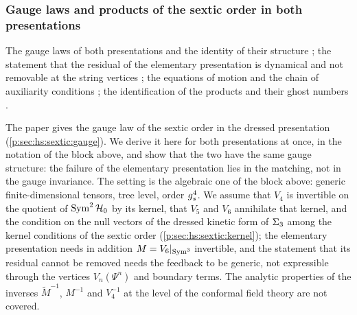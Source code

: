 \subsubsection{Gauge laws and products of the sextic order in both presentations}
\label{sec:order:sextic:both-gauge}

The gauge laws of both presentations and the identity of their structure ; the statement that the residual of the elementary presentation is dynamical and not removable at the string vertices ; the equations of motion and the chain of auxiliarity conditions ; the identification of the products and their ghost numbers .

The paper gives the gauge law of the sextic order in the dressed presentation (\cref{p:sec:hs:sextic:gauge}).
We derive it here for both presentations at once, in the notation of the block above, and show that the two have the same gauge structure: the failure of the elementary presentation lies in the matching, not in the gauge invariance.
The setting is the algebraic one of the block above: generic finite-dimensional tensors, tree level, order $g_s^4$.
We assume that $V_4$ is invertible on the quotient of $\operatorname{Sym}^2 \mathcal{H}_0$ by its kernel, that $V_5$ and $V_6$ annihilate that kernel, and the condition on the null vectors of the dressed kinetic form of $\Sigma_3$ among the kernel conditions of the sextic order (\cref{p:sec:hs:sextic:kernel}); the elementary presentation needs in addition $M = V_6 |_{\operatorname{Sym}^3}$ invertible, and the statement that its residual cannot be removed needs the feedback to be generic, not expressible through the vertices $V_n(\Psi^n)$ and boundary terms.
The analytic properties of the inverses $\tilde M^{-1}$, $M^{-1}$ and $V_4^{-1}$ at the level of the conformal field theory are not covered.

